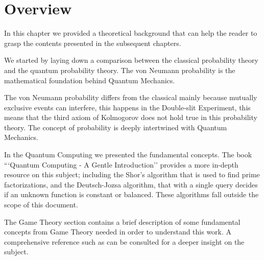 \clearpage
\section{Overview}
\label{sec:background_overview}

In this chapter we provided a theoretical background that can help the reader to grasp the contents presented in the subsequent chapters.

We started by laying down a comparison between the classical probability theory and the quantum probability theory. The von Neumann probability is the mathematical foundation behind Quantum Mechanics. 

The von Neumann probability differs from the classical mainly because mutually exclusive events can interfere, this happens in the Double-slit Experiment, this means that the third axiom of Kolmogorov does not hold true in this probability theory. The concept of probability is deeply intertwined with Quantum Mechanics. 

In the Quantum Computing we presented the fundamental concepts. The book ```Quantum Computing - A Gentle Introduction''\cite{Rieffel2011} provides a more in-depth resource on this subject; including the Shor's algorithm that is used to find prime factorizations, and the Deutsch-Jozsa algorithm, that with a single query decides if an unknown function is constant or balanced. These algorithms fall outside the scope of this document.

The Game Theory section contains a brief description of some fundamental concepts from Game Theory needed in order to understand this work. A comprehensive reference such as \cite{Osborne2004} can be consulted for a deeper insight on the subject.


